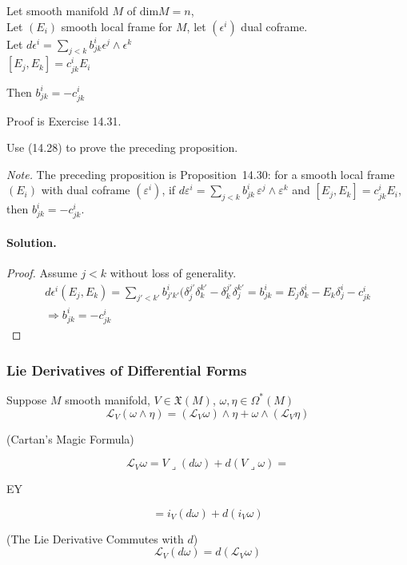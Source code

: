 \begin{proposition}[14.30]
  Let smooth manifold $M$ of $\text{dim}M = n$, \\
  Let $(E_i)$ smooth local frame for $M$, let $(\epsilon^i)$ dual coframe. \\
  Let $d\epsilon^i = \sum_{j<k} b^i_{jk} \epsilon^j \wedge \epsilon^k $ \\
  \phantom{Let }$[E_j,E_k] = c^i_{jk} E_i$

Then $b^i_{jk} = -c^i_{jk}$
\end{proposition}

Proof is Exercise 14.31.  

\begin{exercise}
Use (14.28) to prove the preceding proposition.
\end{exercise}
\noindent\emph{Note.} The preceding proposition is Proposition~14.30: for a smooth local frame $(E_i)$ with dual coframe $(\varepsilon^i)$, if $d\varepsilon^i=\sum_{j<k}b^i_{jk}\,\varepsilon^j\wedge\varepsilon^k$ and $[E_j,E_k]=c^i_{jk}E_i$, then $b^i_{jk}=-c^i_{jk}$.
\paragraph{Solution.}

\begin{proof}
  Assume $j <k$ without loss of generality.  
  \[
\begin{gathered}
  d\epsilon^i(E_j,E_k) = \sum_{j' < k'} b^i_{j'k'}(\delta^{j'}_j \delta^{k'}_k - \delta^{j'}_k \delta^{k'}_j = b^i_{jk} = E_j \delta^i_k - E_k \delta^i_j - c^i_{jk} \\
  \Longrightarrow b^i_{jk} = -c^i_{jk}
\end{gathered}
\]
\end{proof}

\subsubsection*{Lie Derivatives of Differential Forms}


\begin{proposition}[14.33]
  Suppose $M$ smooth manifold, $V \in \mathfrak{X}(M)$, $\omega, \eta \in \Omega^*(M)$ 
\[
\mathcal{L}_V(\omega \wedge \eta) = (\mathcal{L}_V \omega) \wedge \eta + \omega \wedge (\mathcal{L}_V \eta)
\]
\end{proposition}

\begin{theorem}[14.35] (Cartan's Magic Formula) 

\[
\mathcal{L}_V \omega = V \lrcorner (d\omega) + d(V\lrcorner \omega) = 
\]

EY

\[
= i_V(d\omega) + d(i_V\omega)
\]
\end{theorem}

\begin{corollary}[14.36] (The Lie Derivative Commutes with $d$)
\[
\mathcal{L}_V(d\omega) = d(\mathcal{L}_V\omega)
\]
\end{corollary}
